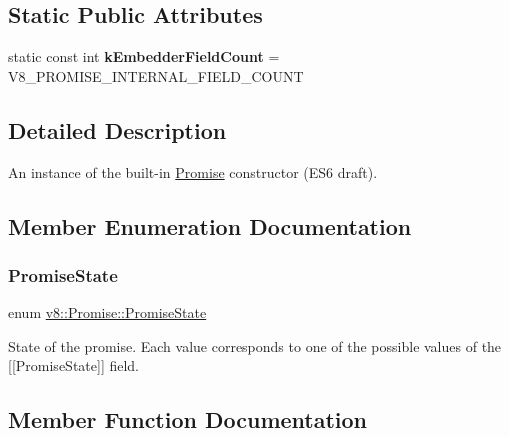 \subsection*{Static Public Attributes}
\begin{DoxyCompactItemize}
\item 
\mbox{\label{classv8_1_1Promise_ab4302ae258f4405f871e24ec4b0ce618}} 
static const int {\bfseries k\+Embedder\+Field\+Count} = V8\+\_\+\+P\+R\+O\+M\+I\+S\+E\+\_\+\+I\+N\+T\+E\+R\+N\+A\+L\+\_\+\+F\+I\+E\+L\+D\+\_\+\+C\+O\+U\+NT
\end{DoxyCompactItemize}


\subsection{Detailed Description}
An instance of the built-\/in \mbox{\hyperlink{classv8_1_1Promise}{Promise}} constructor (E\+S6 draft). 

\subsection{Member Enumeration Documentation}
\mbox{\label{classv8_1_1Promise_a0c357b9d99a634f98a5a203b0a322544}} 
\subsubsection{\texorpdfstring{Promise\+State}{PromiseState}}
{\footnotesize\ttfamily enum \mbox{\hyperlink{classv8_1_1Promise_a0c357b9d99a634f98a5a203b0a322544}{v8\+::\+Promise\+::\+Promise\+State}}}

State of the promise. Each value corresponds to one of the possible values of the \mbox{[}\mbox{[}Promise\+State\mbox{]}\mbox{]} field. 

\subsection{Member Function Documentation}
\mbox{\label{classv8_1_1Promise_ab5b9bc0140b750cbf569f3a0e6c92b42}} 
